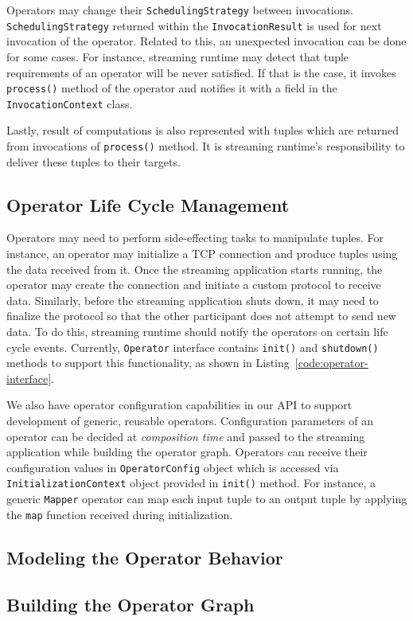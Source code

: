 Operators may change their \texttt{SchedulingStrategy} between invocations. \texttt{SchedulingStrategy} returned within the \texttt{InvocationResult} is used for next invocation of the operator. Related to this, an unexpected invocation can be done for some cases. For instance, streaming runtime may detect that tuple requirements of an operator will be never satisfied. If that is the case, it invokes \texttt{process()} method of the operator and notifies it with a field in the \texttt{InvocationContext} class.

Lastly, result of computations is also represented with tuples which are returned from invocations of \texttt{process()} method. It is streaming runtime's responsibility to deliver these tuples to their targets.

\subsection{Operator Life Cycle Management}\label{sec:operator-lifecycle}

Operators may need to perform side-effecting tasks to manipulate tuples. For instance, an operator may initialize a TCP connection and produce tuples using the data received from it. Once the streaming application starts running, the operator may create the connection and initiate a custom protocol to receive data. Similarly, before the streaming application shuts down, it may need to finalize the protocol so that the other participant does not attempt to send new data. To do this, streaming runtime should notify the operators on certain life cycle events. Currently, \texttt{Operator} interface contains \texttt{init()} and \texttt{shutdown()} methods to support this functionality, as shown in Listing~\ref{code:operator-interface}. 

We also have operator configuration capabilities in our API to support development of generic, reusable operators. Configuration parameters of an operator can be decided at \textit{composition time} and passed to the streaming application while building the operator graph. Operators can receive their configuration values in \texttt{OperatorConfig} object which is accessed via \texttt{InitializationContext} object provided in \texttt{init()} method. For instance, a generic \texttt{Mapper} operator can map each input tuple to an output tuple by applying the \texttt{map} function received during initialization.


\subsection{Modeling the Operator Behavior}\label{sec:operator-behavior}

\subsection{Building the Operator Graph}\label{sec:operator-graph}